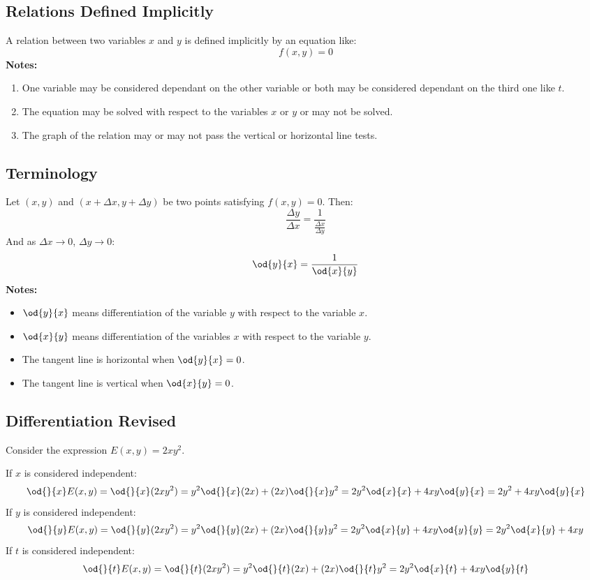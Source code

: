 \subsection{Relations Defined Implicitly}
	A relation between two variables $x$ and $y$ is defined implicitly by an equation like:
	\[f(x,y) = 0\]
	\textbf{Notes:}
	\begin{enumerate}
		\item One variable may be considered dependant on the other variable or both may be considered dependant on the third one like $t$.
		\item The equation may be solved with respect to the variables $x$ or $y$ or may not be solved.
		\item The graph of the relation may or may not pass the vertical or horizontal line tests.
	\end{enumerate}
\subsection{Terminology}
	Let $(x,y)$ and $(x + \Delta x, y + \Delta y)$ be two points satisfying $f(x,y) = 0$. Then:
	\[\frac{\Delta y}{\Delta x} = \frac{1}{\frac{\Delta x}{\Delta y}}\]
	And as $\Delta x \to 0$, $\Delta y \to 0$:
	\[\od{y}{x} = \frac{1}{\od{x}{y}}\]
	\textbf{Notes:}
	\begin{itemize}
		\item $\od{y}{x}$ means differentiation of the variable $y$ with respect to the variable $x$.
		\item $\od{x}{y}$ means differentiation of the variables $x$ with respect to the variable $y$.
		\item The tangent line is horizontal when $\od{y}{x} = 0$.
		\item The tangent line is vertical when $\od{x}{y} = 0$.
	\end{itemize}
\subsection{Differentiation Revised}
	Consider the expression $E(x,y) = 2xy^2$.

	If $x$ is considered independent:
	\[\od{}{x}E(x,y) = \od{}{x}(2xy^2) = y^2 \od{}{x}(2x) + (2x) \od{}{x}y^2 = 2y^2 \od{x}{x} + 4xy\od{y}{x} = 2y^2 + 4xy\od{y}{x}\]
	If $y$ is considered independent:
	\[\od{}{y}E(x,y) = \od{}{y}(2xy^2) = y^2 \od{}{y}(2x) + (2x) \od{}{y}y^2 = 2y^2 \od{x}{y} + 4xy\od{y}{y} = 2y^2\od{x}{y} + 4xy\]
	If $t$ is considered independent:
	\[\od{}{t}E(x,y) = \od{}{t}(2xy^2) = y^2 \od{}{t}(2x) + (2x) \od{}{t}y^2 = 2y^2 \od{x}{t} + 4xy\od{y}{t}\]
